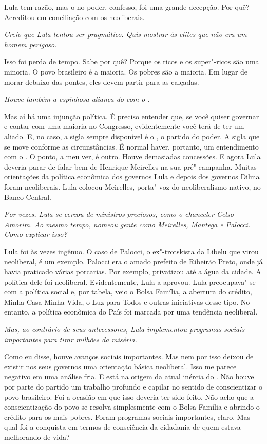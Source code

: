 \normalfont 
Lula tem razão, mas o  no poder, confesso, foi uma
grande decepção. Por quê? Acreditou em conciliação com os neoliberais.

\itshape
Creio que Lula tentou ser pragmático. Quis mostrar às
elites que não era um homem perigoso.

\normalfont 
Isso foi perda de tempo. Sabe por quê? Porque os ricos e
os super"-ricos são uma minoria. O povo brasileiro é a maioria. Os pobres
são a maioria. Em lugar de morar debaixo das pontes, eles devem partir
para as calçadas.

\itshape
Houve também a espinhosa aliança do  com o .

\normalfont 
Mas aí há uma injunção política. É preciso entender que,
se você quiser governar e contar com uma maioria no Congresso,
evidentemente você terá de ter um aliado. E, no caso, a sigla sempre
disponível é o , o partido do poder. A sigla que se move conforme as
circunstâncias. É normal haver, portanto, um entendimento com o . O
ponto, a meu ver, é outro. Houve demasiadas concessões. E agora Lula
deveria parar de falar bem de Henrique Meirelles na sua pré"-campanha.
Muitas orientações da política econômica dos governos Lula e depois dos
governos Dilma foram neoliberais. Lula colocou Meirelles, porta"-voz do
neoliberalismo nativo, no Banco Central.

\itshape
Por vezes, Lula se cercou de ministros preciosos, como
o chanceler Celso Amorim. Ao mesmo tempo, nomeou gente como Meirelles,
Mantega e Palocci. Como explicar isso?

\normalfont 
Lula foi às vezes ingênuo. O caso de Palocci, o
ex"-trotskista da Libelu que virou neoliberal, é um exemplo. Palocci era
o amado prefeito de Ribeirão Preto, onde já havia praticado várias
porcarias. Por exemplo, privatizou até a água da cidade. A política dele
foi neoliberal. Evidentemente, Lula a aprovou. Lula preocupava"-se com a
política social e, por tabela, veio o Bolsa Família, a abertura do
crédito, Minha Casa Minha Vida, o Luz para Todos e outras iniciativas
desse tipo. No entanto, a política econômica do País foi marcada por uma
tendência neoliberal.

\itshape
Mas, ao contrário de seus antecessores, Lula
implementou programas sociais importantes para tirar milhões da miséria.

\normalfont 
Como eu disse, houve avanços sociais importantes. Mas nem
por isso deixou de existir nos seus governos uma orientação básica
neoliberal. Isso me parece negativo em uma análise fria. E está na
origem da atual inércia do . Não houve por parte do partido um
trabalho profundo e capilar no sentido de conscientizar o povo
brasileiro. Foi a ocasião em que isso deveria ter sido feito. Não acho
que a conscientização do povo se resolva simplesmente com o Bolsa
Família e abrindo o crédito para os mais pobres. Foram programas sociais
importantes, claro. Mas qual foi a conquista em termos de consciência da
cidadania de quem estava melhorando de vida?

